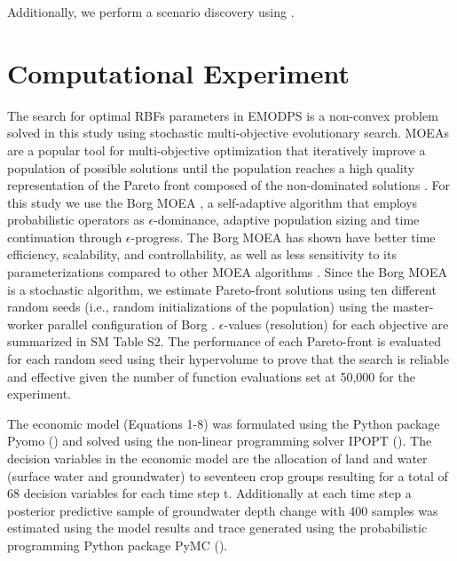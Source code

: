 \documentclass[a4paper,fleqn]{cas-sc}
\begin{document}
Additionally, we perform a scenario discovery using . 

\section{Computational Experiment}

The search for  optimal RBFs parameters in EMODPS is a non-convex problem \citep{giuliani_curses_2016} solved in this study using stochastic multi-objective evolutionary search. MOEAs are a popular tool for multi-objective optimization that iteratively improve a population of possible solutions  until the population reaches a high quality representation of the Pareto front composed of the non-dominated solutions \citep{coello_evolutionary_2007}.  For this study we use the Borg MOEA \citep{hadka_borg_2013}, a self-adaptive algorithm that employs probabilistic operators as $\epsilon$-dominance, adaptive population sizing and time continuation through $\epsilon$-progress. The Borg MOEA has shown have better time efficiency, scalability, and controllability, as well as less sensitivity to its parameterizations compared to other MOEA algorithms \citep{reed_evolutionary_2013,gupta_can_2020,zatarain_salazar_balancing_2017,seyedashraf_assisting_2023}. Since the Borg MOEA is a stochastic algorithm, we estimate Pareto-front solutions using ten different random seeds (i.e., random initializations of the population) using the master-worker parallel configuration of Borg \citep{hadka_large-scale_2015}. $\epsilon$-values (resolution) for each objective are summarized in SM Table S2. The performance of each Pareto-front is evaluated for each random seed using their hypervolume \citep{hadka_diagnostic_2012} to prove that the search is reliable and effective given the number of function evaluations set at 50,000 for the experiment.  

The economic model (Equations 1-8) was formulated using the Python package Pyomo (\cite{hart_pyomo_2011}) and solved using the non-linear programming solver IPOPT (\cite{wachter_implementation_2006}). The decision variables in the economic model are the allocation of land and water (surface water and groundwater) to seventeen crop groups resulting for a total of 68 decision variables for each time step t. Additionally at each time step a posterior predictive sample of groundwater depth change with 400 samples was estimated using the model results and trace generated using the probabilistic programming Python package PyMC  (\cite{salvatier_probabilistic_2016}).
\end{document}
